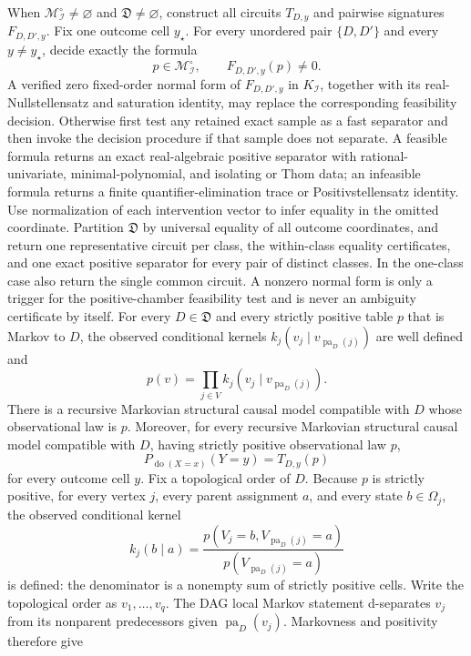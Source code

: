When \(\mathcal M_{\mathcal I}^{\circ}\neq\varnothing\) and \(\mathfrak D\neq\varnothing\), construct all circuits \(T_{D,y}\) and pairwise signatures \(F_{D,D',y}\).  Fix one outcome cell \(y_\star\).  For every unordered pair \(\{D,D'\}\) and every \(y\neq y_\star\), decide exactly the formula
\[
 p\in\mathcal M_{\mathcal I}^{\circ},\qquad F_{D,D',y}(p)\neq0.
\]
A verified zero fixed-order normal form of \(F_{D,D',y}\) in \(K_{\mathcal I}\), together with its real-Nullstellensatz and saturation identity, may replace the corresponding feasibility decision.  Otherwise first test any retained exact sample as a fast separator and then invoke the decision procedure if that sample does not separate.  A feasible formula returns an exact real-algebraic positive separator with rational-univariate, minimal-polynomial, and isolating or Thom data; an infeasible formula returns a finite quantifier-elimination trace or Positivstellensatz identity.  Use normalization of each intervention vector to infer equality in the omitted coordinate.  Partition \(\mathfrak D\) by universal equality of all outcome coordinates, and return one representative circuit per class, the within-class equality certificates, and one exact positive separator for every pair of distinct classes.  In the one-class case also return the single common circuit.  A nonzero normal form is only a trigger for the positive-chamber feasibility test and is never an ambiguity certificate by itself.
For every \(D\in\mathfrak D\) and every strictly positive table \(p\) that is Markov to \(D\), the observed conditional kernels \(k_j(v_j\mid v_{\operatorname{pa}_D(j)})\) are well defined and
\[
 p(v)=\prod_{j\in V}k_j(v_j\mid v_{\operatorname{pa}_D(j)}).
\]
There is a recursive Markovian structural causal model compatible with \(D\) whose observational law is \(p\).  Moreover, for every recursive Markovian structural causal model compatible with \(D\), having strictly positive observational law \(p\),
\[
 P_{\operatorname{do}(X=x)}(Y=y)=T_{D,y}(p)
\]
for every outcome cell \(y\).
Fix a topological order of \(D\).  Because \(p\) is strictly positive, for every vertex \(j\), every parent assignment \(a\), and every state \(b\in\Omega_j\), the observed conditional kernel
\[
 k_j(b\mid a)=\frac{p(V_j=b,V_{\operatorname{pa}_D(j)}=a)}
 {p(V_{\operatorname{pa}_D(j)}=a)}
\]
is defined: the denominator is a nonempty sum of strictly positive cells.  Write the topological order as \(v_1,\ldots,v_q\).  The DAG local Markov statement d-separates \(v_j\) from its nonparent predecessors given \(\operatorname{pa}_D(v_j)\).  Markovness and positivity therefore give
